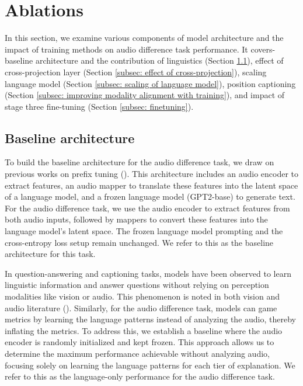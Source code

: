  \vspace{-0.1in}
\section{Ablations} \vspace{-0.1in} \label{sec: ablation overview}
In this section, we examine various components of model architecture and the impact of training methods on audio difference task performance. It covers- baseline architecture and the contribution of linguistics (Section \ref{subsec: baseline architecture}), effect of cross-projection layer (Section \ref{subsec: effect of cross-projection}), scaling language model (Section \ref{subsec: scaling of language model}), position captioning (Section \ref{subsec: improving modality alignment with training}), and impact of stage three fine-tuning (Section \ref{subsec: finetuning}).

\vspace{-0.1in}
\subsection{Baseline architecture} \label{subsec: baseline architecture} \vspace{-0.1in}
To build the baseline architecture for the audio difference task, we draw on previous works on prefix tuning (\cite{mspengi}). This architecture includes an audio encoder to extract features, an audio mapper to translate these features into the latent space of a language model, and a frozen language model (GPT2-base) to generate text. For the audio difference task, we use the audio encoder to extract features from both audio inputs, followed by mappers to convert these features into the language model’s latent space. The frozen language model prompting and the cross-entropy loss setup remain unchanged. We refer to this as the baseline architecture for this task.

In question-answering and captioning tasks, models have been observed to learn linguistic information and answer questions without relying on perception modalities like vision or audio. This phenomenon is noted in both vision and audio literature (\cite{clothoaqa}). Similarly, for the audio difference task, models can game metrics by learning the language patterns instead of analyzing the audio, thereby inflating the metrics. To address this, we establish a baseline where the audio encoder is randomly initialized and kept frozen. This approach allows us to determine the maximum performance achievable without analyzing audio, focusing solely on learning the language patterns for each tier of explanation. We refer to this as the language-only performance for the audio difference task.


